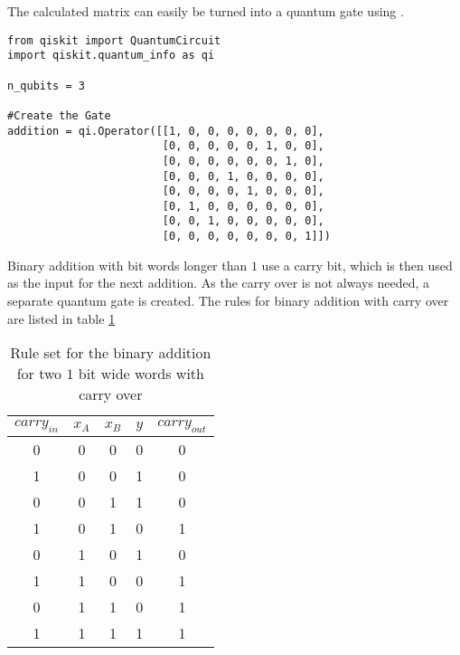 The calculated matrix can easily be turned into a quantum gate using .

\begin{verbatim}
from qiskit import QuantumCircuit
import qiskit.quantum_info as qi

n_qubits = 3

#Create the Gate
addition = qi.Operator([[1, 0, 0, 0, 0, 0, 0, 0],
                        [0, 0, 0, 0, 0, 1, 0, 0],
                        [0, 0, 0, 0, 0, 0, 1, 0],
                        [0, 0, 0, 1, 0, 0, 0, 0],
                        [0, 0, 0, 0, 1, 0, 0, 0],
                        [0, 1, 0, 0, 0, 0, 0, 0],
                        [0, 0, 1, 0, 0, 0, 0, 0],
                        [0, 0, 0, 0, 0, 0, 0, 1]])
\end{verbatim}

Binary addition with bit words longer than $1$ use a carry bit, which is then used as the input for the next addition. As the carry over is not always needed, a separate quantum gate is created. The rules for binary addition with carry over are listed in table \ref{table:binary_addition_carry_over}

\begin{table}[!h]
    \centering
    \begin{tabular}{|c|c|c|c|c|}
        \hline
        $carry_{in}$ & $x_A$ & $x_B$ & $y$ & $carry_{out}$ \\ \hline
        0             & 0     & 0     & 0   & 0              \\ \hline
        1             & 0     & 0     & 1   & 0              \\ \hline
        0             & 0     & 1     & 1   & 0              \\ \hline
        1             & 0     & 1     & 0   & 1              \\ \hline
        0             & 1     & 0     & 1   & 0              \\ \hline
        1             & 1     & 0     & 0   & 1              \\ \hline
        0             & 1     & 1     & 0   & 1              \\ \hline
        1             & 1     & 1     & 1   & 1              \\ \hline
        \end{tabular}
    \caption{Rule set for the binary addition for two $1$ bit wide words with carry over}
    \label{table:binary_addition_carry_over}
\end{table}

